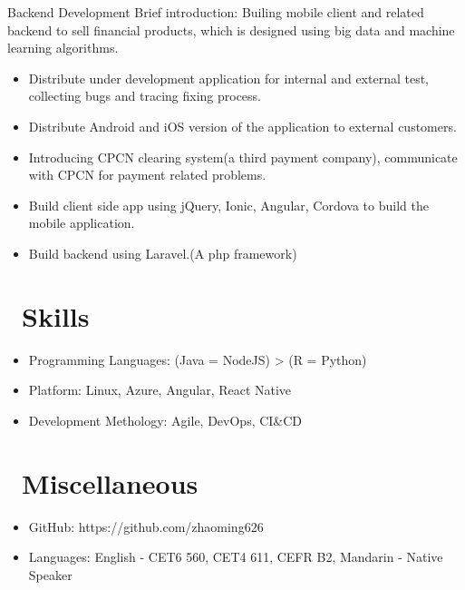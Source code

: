 \documentclass{resume}
\begin{document}
 {Backend Development}
Brief introduction: Builing mobile client and related backend to sell financial products, which is designed using big data and machine learning algorithms.
\begin{itemize}
  \item Distribute under development application for internal and external test, collecting bugs and tracing fixing process.
  \item Distribute Android and iOS version of the application to external customers.
  \item Introducing CPCN clearing system(a third payment company), communicate with CPCN for payment related problems.
  \item Build client side app using jQuery, Ionic, Angular, Cordova to build the mobile application. 
  \item Build backend using Laravel.(A php framework)
\end{itemize}



\section{\faCogs\ Skills}
\begin{itemize}[parsep=0.5ex]
  \item Programming Languages: (Java = NodeJS) > (R = Python) 
  \item Platform: Linux, Azure, Angular, React Native
  \item Development Methology: Agile, DevOps, CI\&CD
\end{itemize}

\section{\faInfo\ Miscellaneous}
\begin{itemize}[parsep=0.5ex]
  \item GitHub: https://github.com/zhaoming626
  \item Languages: English - CET6 560, CET4 611, CEFR B2, Mandarin - Native Speaker
\end{itemize}

%
%
\end{document}
